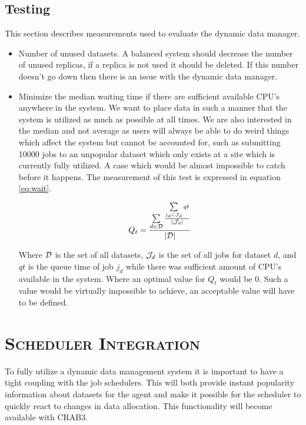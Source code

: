 \documentclass[11pt,a4page]{article}
\begin{document}
  \subsection{Testing}
    This section describes measurements used to evaluate the dynamic data manager.
    \begin{itemize}
      \item Number of unused datasets. A balanced system should decrease the number of unused replicas, if a replica is not used it should be deleted. If this number doesn't go down then there is an issue with the dynamic data manager.

      \item Minimize the median waiting time if there are sufficient available CPU's anywhere in the system. We want to place data in such a manner that the system is utilized as much as possible at all times. We are also interested in the median and not average as users will always be able to do weird things which affect the system but cannot be accounted for, such as submitting 10000 jobs to an unpopular dataset which only exists at a site which is currently fully utilized. A case which would be almost impossible to catch before it happens. The measurement of this test is expressed in equation \ref{eq:wait}.

      \begin{equation}\label{eq:wait}
        Q_t = \frac{\sum\limits_{d \in {\cal D}} \frac{\sum\limits_{j_d \in {\cal J}_d} qt}{|{\cal J}_d|}}{|{\cal D}|}
      \end{equation}

      Where ${\cal D}$ is the set of all datasets, ${\cal J}_d$ is the set of all jobs for dataset $d$, and $qt$ is the queue time of job $j_d$ while there was sufficient amount of CPU's available in the system. Where an optimal value for $Q_t$ would be $0$. Such a value would be virtually impossible to achieve, an acceptable value will have to be defined.
    \end{itemize}


\section{\textsc{Scheduler Integration}}
  To fully utilize a dynamic data management system it is important to have a tight coupling with the job schedulers. This will both provide instant popularity information about datasets for the agent and make it possible for the scheduler to quickly react to changes in data allocation. This functionality will become available with CRAB3.



\end{document}
